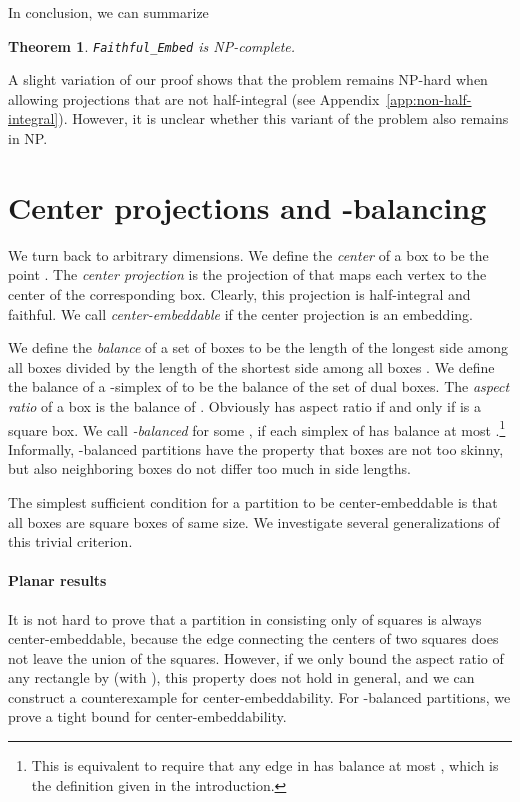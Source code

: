 \documentclass[12pt]{article}
\newtheorem{theorem}{Theorem}
\begin{document}
In conclusion, we can summarize

\begin{theorem}
\texttt{Faithful\_Embed} is NP-complete.
\end{theorem}

A slight variation of our proof
shows that the problem remains NP-hard when allowing projections that are not half-integral
(see Appendix~\ref{app:non-half-integral}).
However, it is unclear whether this variant of the problem also remains in NP.

\section{Center projections and -balancing}
\label{sec:balancing}

We turn back to arbitrary dimensions.
We define the \emph{center} of a box  
to be the point
. The \emph{center projection} is the projection of 
that maps each vertex to the center of the corresponding box. Clearly,
this projection is half-integral and faithful. We call  \emph{center-embeddable} if the center projection
is an embedding. 

We define the \emph{balance} of
a set of boxes 
to be the length of the longest side among all boxes  divided by the length of the shortest side
among all boxes .
We define the balance of a -simplex  of  to be the balance of the set of dual boxes.
The \emph{aspect ratio} of a box  is the balance of .
Obviously  has aspect ratio  if and only if  is a square box.
We call  \emph{-balanced} for some , if each simplex
of  has balance at most .\footnote{This is equivalent to require
that any edge in  has balance at most , which is the definition
given in the introduction.}
Informally, 
-balanced partitions have the property that 
boxes are not too skinny, but also
neighboring boxes do not differ
too much in side lengths. 

The simplest sufficient condition for a partition to be center-embeddable is that all boxes
are square boxes of same size. We investigate several generalizations of this trivial criterion.

\paragraph{Planar results}
It is not hard to prove that a partition in  consisting 
only of squares is always center-embeddable, 
because the edge connecting the centers of two squares does not leave the union of the squares.
However, if we only bound the aspect ratio of any rectangle by  (with ),
this property does not hold in general, and we can construct a counterexample
for center-embeddability.
For -balanced partitions, we prove a tight bound for center-embeddability. 
\end{document}
